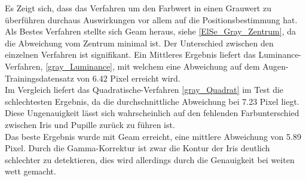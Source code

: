 Es Zeigt sich, dass das Verfahren um den Farbwert in einen Grauwert zu überführen durchaus Auswirkungen vor allem auf die Positionsbestimmung hat.\\
Als Bestes Verfahren stellte sich Geam heraus, siehe \autoref{ElSe_Gray_Zentrum}, da die Abweichung vom Zentrum minimal ist. Der Unterschied zwischen den einzelnen Verfahren ist signifikant. Ein Mittleres Ergebnis liefert das Luminance-Verfahren, \autoref{gray_Luminance}, mit welchem eine Abweichung auf dem Augen-Trainingsdatensatz \cite{database_Eye} von 6.42 Pixel erreicht wird.\\
Im Vergleich liefert das Quadratische-Verfahren \autoref{gray_Quadrat} im Test die schlechtesten Ergebnis, da die durchschnittliche Abweichung bei 7.23 Pixel liegt. Diese Ungenauigkeit lässt sich wahrscheinlich auf den fehlenden Farbunterschied zwischen Iris und Pupille  zurück zu führen ist.\\
Das beste Ergebnis wurde mit Geam erreicht, eine mittlere Abweichung von 5.89 Pixel. Durch die Gamma-Korrektur ist zwar die Kontur der Iris deutlich schlechter zu detektieren, dies wird allerdings durch die Genauigkeit bei weiten wett gemacht.\\
